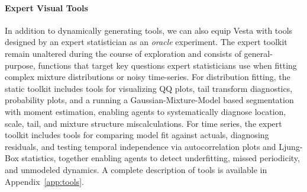 \documentclass{article}
\newcommand\gd[1]{\todo[color=red!40]{{\bf Greg}: #1}}
\newcommand\jl[1]{\todo[color=blue!40]{{\bf Jessy}: #1}}
\newcommand{\method}{{\sc Vesta}}
\begin{document}





\vspace{-0.3em}
\paragraph{Expert Visual Tools}
In addition to dynamically generating tools, we can also equip \method{} with tools designed by an expert statistician as an \emph{oracle} experiment.
The expert toolkit remain unaltered during the course of exploration
and
consists of general-purpose, functions that target key questions expert statisticians use when fitting complex mixture distributions or noisy time-series. For distribution fitting, the static toolkit includes tools for visualizing QQ plots, tail transform diagnostics, probability plots, and a running a Gaussian-Mixture-Model based segmentation with moment estimation, enabling agents to systematically diagnose location, scale, tail, and mixture structure miscalculations. For time series, the expert toolkit includes tools for comparing model fit against actuals, diagnosing residuals, and testing temporal independence via autocorrelation plots and Ljung-Box statistics, together enabling agents to detect underfitting, missed periodicity, and unmodeled dynamics. A complete description of tools is available in Appendix~\ref{app:tools}. 
\end{document}
